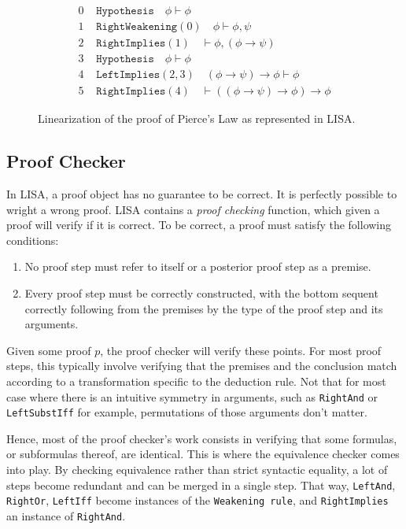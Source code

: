 \begin{figure}

\begin{equation}
\begin{split}
0 &\texttt { Hypothesis} \quad \phi \vdash \phi\\
1 &\texttt { RightWeakening}(0) \quad  \phi \vdash \phi, \psi\\
2 &\texttt { RightImplies}(1) \quad  \vdash \phi, (\phi \to \psi)\\
3 &\texttt { Hypothesis} \quad \phi \vdash \phi\\
4 &\texttt { LeftImplies}(2,3) \quad (\phi \to \psi) \to \phi \vdash \phi\\
5 &\texttt { RightImplies}(4) \quad \vdash ((\phi \to \psi) \to \phi) \to \phi
\end{split}
\end{equation}
    \caption{Linearization of the proof of Pierce's Law as represented in LISA.}
    \label{fig:exampleProofLinear}
\end{figure}

\subsection{Proof Checker}
\label{subs:proofchecker}

In LISA, a proof object has no guarantee to be correct. It is perfectly possible to wright a wrong proof. LISA contains a \textit{proof checking} function, which given a proof will verify if it is correct. To be correct, a proof must satisfy the following conditions:
\begin{enumerate}
    \item No proof step must refer to itself or a posterior proof step as a premise.
    \item Every proof step must be correctly constructed, with the bottom sequent correctly following from the premises by the type of the proof step and its arguments.
\end{enumerate}

Given some proof $p$, the proof checker will verify these points. For most proof steps, this typically involve verifying that the premises and the conclusion match according to a transformation specific to the deduction rule. Not that for most case where there is an intuitive symmetry in arguments, such as \texttt{RightAnd} or \texttt{LeftSubstIff} for example, permutations of those arguments don't matter.

Hence, most of the proof checker's work consists in verifying that some formulas, or subformulas thereof, are identical. This is where the equivalence checker comes into play. By checking equivalence rather than strict syntactic equality, a lot of steps become redundant and can be merged in a single step. That way, \texttt{LeftAnd}, \texttt{RightOr}, \texttt{LeftIff} become instances of the \texttt{Weakening rule}, and \texttt{RightImplies} an instance of \texttt{RightAnd}. 

